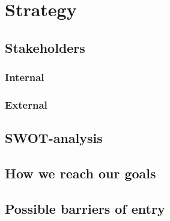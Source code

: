 \chapter{Strategy} \label{strategy}
\section{Stakeholders}
\subsection{Internal}
\subsection{External}
\section{SWOT-analysis}
\section{How we reach our goals}
\section{Possible barriers of entry}
